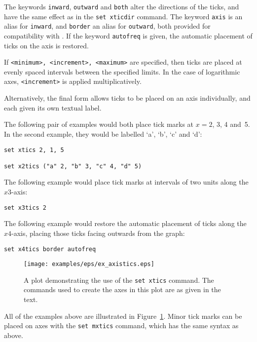 The keywords {\tt inward}, {\tt outward} and {\tt both} alter the
directions of the ticks, and have the same effect as in the {\tt set
xticdir} command. The keyword {\tt axis} is an alias for {\tt inward},
and {\tt border} an alias for {\tt outward}, both provided for
compatibility with \gnuplot. If the keyword {\tt autofreq} is given, the automatic
placement of ticks on the axis is restored.

If {\tt <minimum>, <increment>, <maximum>} are specified, then ticks are
placed at evenly spaced intervals between the specified limits. In the case of
logarithmic axes, {\tt <increment>} is applied multiplicatively.

Alternatively, the final form allows ticks to be placed on an axis
individually, and each given its own textual label.

The following pair of examples would both place tick marks at $x=2$, 3, 4 and~5.
In the second example, they would be labelled `a', `b', `c' and `d':

\begin{verbatim}
set xtics 2, 1, 5

set x2tics ("a" 2, "b" 3, "c" 4, "d" 5)
\end{verbatim}

The following example would place tick marks at intervals of two units along
the $x3$-axis:

\begin{verbatim}
set x3tics 2
\end{verbatim}

The following example would restore the automatic placement of ticks along the
$x4$-axis, placing those ticks facing outwards from the graph:

\begin{verbatim}
set x4tics border autofreq
\end{verbatim}

\begin{figure}
\begin{center}
\texttt{[image: examples/eps/ex\_axistics.eps]}
\end{center}
\caption{A plot demonstrating the use of the {\tt set xtics} command. The commands used to create the axes in this plot are as given in the text.}
\label{fig:ex_axistics}
\end{figure}


All of the examples above are illustrated in Figure~\ref{fig:ex_axistics}.
Minor tick marks can be placed on axes with the {\tt set mxtics} command,
which has the same syntax as above.

